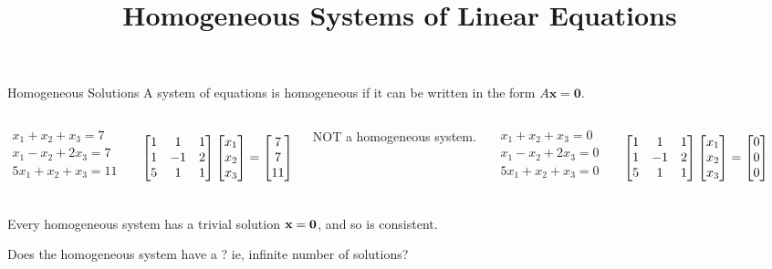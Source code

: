 \documentclass[xcolor=dvipsnames,aspectratio=169,t]{beamer}
\title{Homogeneous Systems of Linear Equations}
\begin{document}
\maketitle

\begin{frame}{Homogeneous Solutions}
  \bbox
  A system of equations is \alert{homogeneous} if it can be written in the form $A \mathbf{x} = \mathbf{0}$.
  \ebox
  \vspace*{-1.5em}

  \begin{columns}
    \column{0.5\tw}
    \[
    \begin{array}{l}
     x_1 +x_2 +x_3=7 \\
     x_1 -x_2 +2x_3= 7\\
     5x_1+x_2+x_3=11
    \end{array}  \]

    \[   \begin{bmatrix}
    1 & 1 & 1 \\
    1 & -1 & 2 \\
    5 & 1 & 1 \end{bmatrix} \begin{bmatrix} x_1 \\ x_2 \\ x_3 \end{bmatrix} = \begin{bmatrix} 7 \\ 7 \\ 11\end{bmatrix}  \]

    \hspace*{2em} \alert{NOT a homogeneous system.}

    \column{0.5\tw}
    \[
    \begin{array}{l}
     x_1 +x_2 +x_3=0 \\
     x_1 -x_2 +2x_3= 0\\
     5x_1+x_2+x_3=0
    \end{array}  \]

    \[   \begin{bmatrix}
    1 & 1 & 1 \\
    1 & -1 & 2 \\
    5 & 1 & 1 \end{bmatrix} \begin{bmatrix} x_1 \\ x_2 \\ x_3 \end{bmatrix} = \begin{bmatrix} 0 \\ 0 \\ 0\end{bmatrix}  \]

    \hspace*{2em} 
  \end{columns}
  \medskip

  \pause
  \bbox
    Every homogeneous system has a \alert{trivial solution} $\mathbf{x}=\mathbf{0}$, and so is \alert{consistent}.
    \smallskip
    
    Does the homogeneous system have a ?
    ie, infinite number of solutions?
  \ebox

\end{frame}
\end{document}
